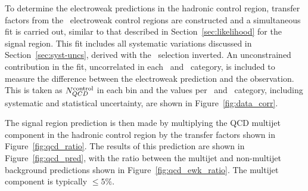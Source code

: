 To determine the electroweak predictions in the hadronic control region, transfer factors 
from the \mhtmet~electroweak control regions are constructed and a simultaneous
fit is carried out, similar to that described in Section~\ref{sec:likelihood} for the signal region. 
This fit includes all systematic variations discussed in Section~\ref{sec:syst-uncs}, 
derived with the \mhtmet~selection inverted. An unconstrained contribution in the fit, 
uncorrelated in each \njet~and \scalht~category, is included to measure the difference between 
the electroweak prediction and the observation. This is taken as $N_{QCD}^{\rm control}$ in each bin and
the values per \njet~and \scalht~category, including systematic and statistical uncertainty,
are shown in Figure~\ref{fig:data_corr}. 

The signal region prediction is then made by multiplying the QCD multijet component in the hadronic 
control region by the transfer factors shown in Figure~\ref{fig:qcd_ratio}. The results of this prediction
are shown in Figure~\ref{fig:qcd_pred}, with the ratio between the multijet and non-multijet background
predictions shown in Figure~\ref{fig:qcd_ewk_ratio}. The multijet component is typically $\le 5\%$. 

